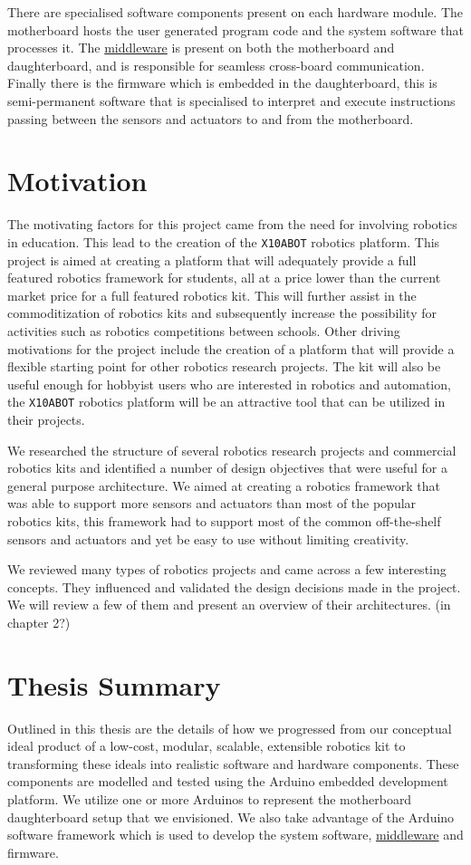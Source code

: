 There are specialised software components present on each hardware module. The motherboard hosts the user generated program code and the system software that processes it. The \hyperref[ssub:middleware]{middleware} is present on both the motherboard and daughterboard, and is responsible for seamless cross-board communication. Finally there is the firmware which is embedded in the daughterboard, this is semi-permanent software that is specialised to interpret and execute instructions passing between the sensors and actuators to and from the motherboard.

\section {Motivation}
The motivating factors for this project came from the need for involving
robotics in education. This lead to the creation of the \texttt{X10ABOT} robotics
platform. This project is aimed at creating a platform that will 
adequately provide a full featured robotics framework for students, all at a
price lower than the current market price for a full featured robotics kit.
This will further assist in the commoditization of robotics kits and subsequently
increase the possibility for activities such as robotics competitions between schools.
Other driving motivations for the project include the creation of a platform that
will provide a flexible starting point for other robotics research projects. The kit
will also be useful enough for hobbyist users who are interested in robotics
and automation, the \texttt{X10ABOT} robotics platform will be an attractive tool that
can be utilized in their projects.


We researched the structure of several robotics research projects and commercial robotics kits and identified a number of design objectives that were useful for a general purpose architecture. We aimed at creating a robotics framework that was able to support more sensors and actuators than most of the popular robotics kits, this framework had to support most of the common off-the-shelf sensors and actuators and yet be easy to use without limiting creativity. 

We reviewed many types of robotics projects and came across a few interesting concepts. They influenced and validated the design decisions made in the \xten project. We will review a few of them and present an overview of their architectures. (in chapter 2?)

\section{Thesis Summary}
Outlined in this thesis are the details of how we progressed from our conceptual ideal product of a low-cost, modular, scalable, extensible robotics kit to transforming these ideals into realistic software and hardware components. These components are modelled and tested using the Arduino embedded development platform. We utilize one or more Arduinos to represent the motherboard daughterboard setup that we envisioned. We also take advantage of the Arduino software framework which is used to develop the system software, \hyperref[ssub:middleware]{middleware} and firmware.

